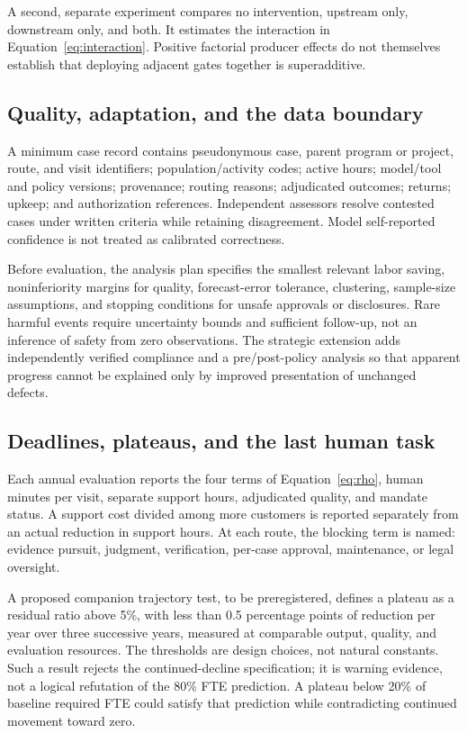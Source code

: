A second, separate experiment compares no intervention, upstream only, downstream only, and both. It
estimates the interaction in Equation~\eqref{eq:interaction}. Positive factorial producer effects do
not themselves establish that deploying adjacent gates together is superadditive.

\subsection{Quality, adaptation, and the data boundary}

A minimum case record contains pseudonymous case, parent program or project, route, and visit
identifiers; population/activity codes; active hours; model/tool and policy versions; provenance;
routing reasons; adjudicated outcomes; returns; upkeep; and authorization references. Independent
assessors resolve contested cases under written criteria while retaining disagreement. Model
self-reported confidence is not treated as calibrated correctness.

Before evaluation, the analysis plan specifies the smallest relevant labor saving, noninferiority
margins for quality, forecast-error tolerance, clustering, sample-size assumptions, and stopping
conditions for unsafe approvals or disclosures. Rare harmful events require uncertainty bounds and
sufficient follow-up, not an inference of safety from zero observations. The strategic extension adds
independently verified compliance and a pre/post-policy analysis so that apparent progress cannot be
explained only by improved presentation of unchanged defects.

\subsection{Deadlines, plateaus, and the last human task}

Each annual evaluation reports the four terms of Equation~\eqref{eq:rho}, human minutes per visit,
separate support hours, adjudicated quality, and mandate status. A support cost divided among more
customers is reported separately from an actual reduction in support hours. At each route, the blocking
term is named: evidence pursuit, judgment, verification, per-case approval, maintenance, or legal
oversight.

A proposed companion trajectory test, to be preregistered, defines a plateau as a residual ratio above 5\%, with less
than 0.5 percentage points of reduction per year over three successive years, measured at comparable
output, quality, and evaluation resources. The thresholds are design choices, not natural constants.
Such a result rejects the continued-decline specification; it is warning evidence, not a logical
refutation of the 80\% FTE prediction. A plateau below 20\% of baseline required FTE could satisfy
that prediction while contradicting continued movement toward zero.


